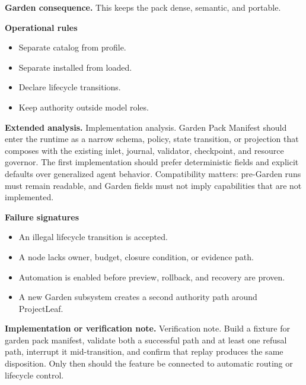\documentclass[10pt,letterpaper,oneside]{article}
\begin{document}
\textbf{Garden consequence.} This keeps the pack dense, semantic, and portable.

\textbf{Operational rules}
\begin{itemize}
\item Separate catalog from profile.
\item Separate installed from loaded.
\item Declare lifecycle transitions.
\item Keep authority outside model roles.
\end{itemize}
\textbf{Extended analysis.} Implementation analysis. Garden Pack Manifest should enter the runtime as a narrow schema, policy, state transition, or projection that composes with the existing inlet, journal, validator, checkpoint, and resource governor. The first implementation should prefer deterministic fields and explicit defaults over generalized agent behavior. Compatibility matters: pre-Garden runs must remain readable, and Garden fields must not imply capabilities that are not implemented.

\textbf{Failure signatures}
\begin{itemize}
\item An illegal lifecycle transition is accepted.
\item A node lacks owner, budget, closure condition, or evidence path.
\item Automation is enabled before preview, rollback, and recovery are proven.
\item A new Garden subsystem creates a second authority path around ProjectLeaf.
\end{itemize}
\textbf{Implementation or verification note.} Verification note. Build a fixture for garden pack manifest, validate both a successful path and at least one refusal path, interrupt it mid-transition, and confirm that replay produces the same disposition. Only then should the feature be connected to automatic routing or lifecycle control.
\end{document}

